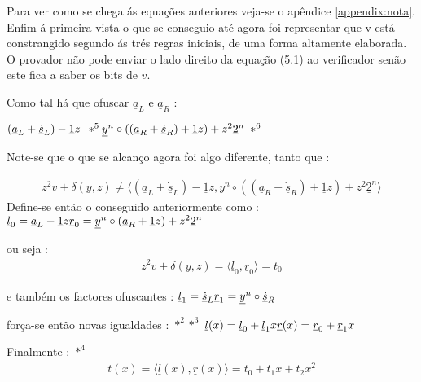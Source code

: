 Para ver como se chega ás equações anteriores veja-se o apêndice \ref{appendix:nota}. Enfim á primeira vista o que se conseguio até agora foi representar que v está constrangido segundo ás trés regras iniciais, de uma forma altamente elaborada.\newline
O provador não pode enviar o lado direito da equação (5.1) ao verificador senão este fica a saber os bits de $v$.

Como tal há que ofuscar $\underline{a}_L$ e $\underline{a}_R$ :\newline

$(\underline{a}_L + \underline{\dot{s}}_L ) - \underline{1}z\enspace *^5\\
\underline{y}^n \circ ((\underline{a}_R + \underline{\dot{s}}_R) + \underline{1}z) + z^2 \underline{2}^n\enspace *^6$


Note-se que o que se alcanço agora foi algo diferente, tanto que : 

\begin{align*}
z^2 v + \delta(y,z) \neq \langle(\underline{a}_L + \underline{\dot{s}}_L) - \underline{1}z, \underline{y}^n \circ ((\underline{a}_R + \underline{\dot{s}}_R) + \underline{1}z) + z^2 \underline{2}^n\rangle 
\end{align*}
\newline
Define-se então o conseguido anteriormente como : \newline
$\underline{l}_0 = \underline{a}_L - \underline{1}z\\
\underline{r}_0 = \underline{y}^n \circ (\underline{a}_R + \underline{1}z) + z^2 \underline{2}^n$

ou seja :
\begin{align*}
z^2 v + \delta(y,z) = \langle \underline{l}_0, \underline{r}_0 \rangle = t_0
\end{align*}

e também os factores ofuscantes : \newline
$\underline{l}_1 = \underline{\dot{s}}_L\\
\underline{r}_1 = \underline{y}^n \circ \underline{\dot{s}}_R$

força-se então novas igualdades : $*^2$$*^3$ \newline
$\underline{l}(x) = \underline{l}_0 + \underline{l}_1 x\\
\underline{r}(x) = \underline{r}_0 + \underline{r}_1 x$

Finalmente : $*^4$
\begin{align*}
t(x) = \langle \underline{l}(x), \underline{r}(x)\rangle = t_0 + t_1 x + t_2 x^2
\end{align*}

